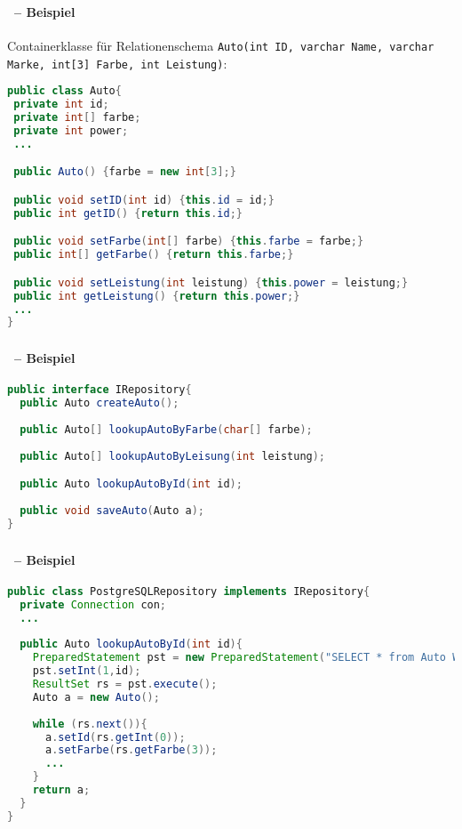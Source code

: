 \begin{frame}[fragile]\frametitle{\insertsection}
	\framesubtitle{\insertsubsection\ -- Beispiel}
	Containerklasse f\"ur Relationenschema
	\nl
	\texttt{\small Auto(int ID, varchar Name, varchar Marke, int[3] Farbe, int Leistung)}:
\begin{lstlisting}[xleftmargin=3ex, language=Java]
public class Auto{
 private int id; 		
 private int[] farbe; 		
 private int power; 
 ...

 public Auto() {farbe = new int[3];}

 public void setID(int id) {this.id = id;}
 public int getID() {return this.id;}

 public void setFarbe(int[] farbe) {this.farbe = farbe;}
 public int[] getFarbe() {return this.farbe;}

 public void setLeistung(int leistung) {this.power = leistung;}
 public int getLeistung() {return this.power;}
 ...
}
\end{lstlisting}
\end{frame}

\begin{frame}[fragile]\frametitle{\insertsection}
	\framesubtitle{\insertsubsection\ -- Beispiel}
\begin{lstlisting}[xleftmargin=3ex, language=Java]
public interface IRepository{
  public Auto createAuto(); 
		
  public Auto[] lookupAutoByFarbe(char[] farbe); 
  		
  public Auto[] lookupAutoByLeisung(int leistung); 

  public Auto lookupAutoById(int id); 
		
  public void saveAuto(Auto a); 	
}
\end{lstlisting}
\end{frame}

\begin{frame}[fragile]\frametitle{\insertsection}
	\framesubtitle{\insertsubsection\ -- Beispiel}
\begin{lstlisting}[xleftmargin=3ex, showstringspaces=false, language=Java]
public class PostgreSQLRepository implements IRepository{
  private Connection con; 
  ... 
  
  public Auto lookupAutoById(int id){
    PreparedStatement pst = new PreparedStatement("SELECT * from Auto WHERE id = ?"); 
    pst.setInt(1,id); 
    ResultSet rs = pst.execute(); 
    Auto a = new Auto(); 
    
    while (rs.next()){
      a.setId(rs.getInt(0));
      a.setFarbe(rs.getFarbe(3));
      ...
    }
    return a;
  }
}
\end{lstlisting}
\end{frame}

